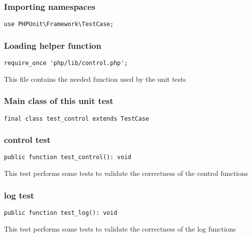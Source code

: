 \documentclass[a4paper]{article}
\begin{document}
\hypertarget{toc99}{}
\subsubsection{Importing namespaces}

\begin{lstlisting}
use PHPUnit\Framework\TestCase;
\end{lstlisting}

\hypertarget{toc100}{}
\subsubsection{Loading helper function}

\begin{lstlisting}
require_once 'php/lib/control.php';
\end{lstlisting}

This file contains the needed function used by the unit tests

\hypertarget{toc101}{}
\subsubsection{Main class of this unit test}

\begin{lstlisting}
final class test_control extends TestCase
\end{lstlisting}

\hypertarget{toc102}{}
\subsubsection{control test}

\begin{lstlisting}
public function test_control(): void
\end{lstlisting}

This test performs some tests to validate the correctness
of the control functions

\hypertarget{toc103}{}
\subsubsection{log test}

\begin{lstlisting}
public function test_log(): void
\end{lstlisting}

This test performs some tests to validate the correctness
of the log functions
\end{document}

